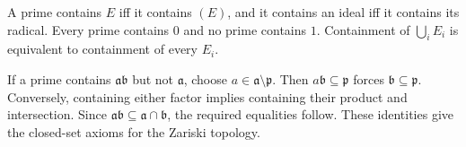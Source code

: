 A prime contains $E$ iff it contains $(E)$, and it contains an ideal iff it contains its radical. Every prime contains $0$ and no prime contains $1$. Containment of $\bigcup_iE_i$ is equivalent to containment of every $E_i$.

If a prime contains $\mathfrak a\mathfrak b$ but not $\mathfrak a$, choose $a\in\mathfrak a\setminus\mathfrak p$. Then $a\mathfrak b\subseteq\mathfrak p$ forces $\mathfrak b\subseteq\mathfrak p$. Conversely, containing either factor implies containing their product and intersection. Since $\mathfrak a\mathfrak b\subseteq\mathfrak a\cap\mathfrak b$, the required equalities follow. These identities give the closed-set axioms for the Zariski topology.
